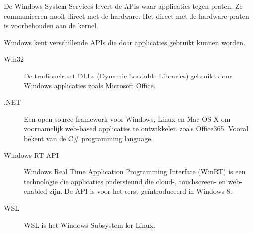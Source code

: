 De Windows System Services levert de APIs waar applicaties tegen praten. Ze communiceren nooit direct met de hardware. Het direct met de hardware praten is voorbehouden aan de kernel.

Windows kent verschillende APIs die door applicaties gebruikt kunnen worden.
\begin{description}
\item[Win32] De tradionele set DLLs (Dynamic Loadable Libraries) gebruikt door Windows applicaties zoals Microsoft Office.
\item[.NET] Een open source framework voor Windows, Linux en Mac OS X om voornamelijk web-based applicaties te ontwikkelen zoals Office365. Vooral bekent van de C\# programming language.
\item[Windows RT API] Windows Real Time Application Programming Interface (WinRT) is een technologie die applicaties ondersteund die cloud-, touchscreen- en web-enabled zijn. De API is voor het eerst ge\"introduceerd in Windows 8.
\item[WSL] WSL is het Windows Subsystem for Linux.
\end{description}

